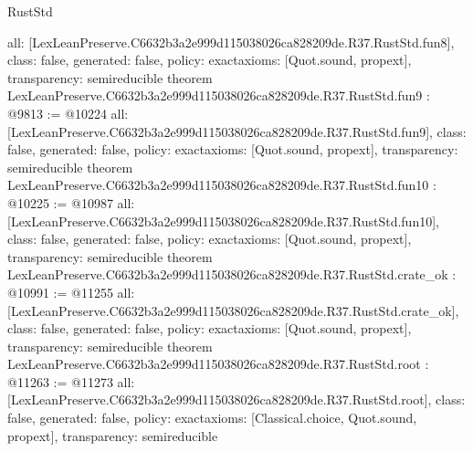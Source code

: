 \begin{lexlean}{RustStd}
\begin{coremodule}
{  all: [LexLeanPreserve.C6632b3a2e999d115038026ca828209de.R37.RustStd.fun8],
  class: false,
  generated: false,
  policy: exact{axioms: [Quot.sound, propext]},
  transparency: semireducible
}
theorem LexLeanPreserve.C6632b3a2e999d115038026ca828209de.R37.RustStd.fun9 : @9813 := @10224 {
  all: [LexLeanPreserve.C6632b3a2e999d115038026ca828209de.R37.RustStd.fun9],
  class: false,
  generated: false,
  policy: exact{axioms: [Quot.sound, propext]},
  transparency: semireducible
}
theorem LexLeanPreserve.C6632b3a2e999d115038026ca828209de.R37.RustStd.fun10 : @10225 := @10987 {
  all: [LexLeanPreserve.C6632b3a2e999d115038026ca828209de.R37.RustStd.fun10],
  class: false,
  generated: false,
  policy: exact{axioms: [Quot.sound, propext]},
  transparency: semireducible
}
theorem LexLeanPreserve.C6632b3a2e999d115038026ca828209de.R37.RustStd.crate_ok : @10991 := @11255 {
  all: [LexLeanPreserve.C6632b3a2e999d115038026ca828209de.R37.RustStd.crate_ok],
  class: false,
  generated: false,
  policy: exact{axioms: [Quot.sound, propext]},
  transparency: semireducible
}
theorem LexLeanPreserve.C6632b3a2e999d115038026ca828209de.R37.RustStd.root : @11263 := @11273 {
  all: [LexLeanPreserve.C6632b3a2e999d115038026ca828209de.R37.RustStd.root],
  class: false,
  generated: false,
  policy: exact{axioms: [Classical.choice, Quot.sound, propext]},
  transparency: semireducible
}


\end{coremodule}
\end{lexlean}
